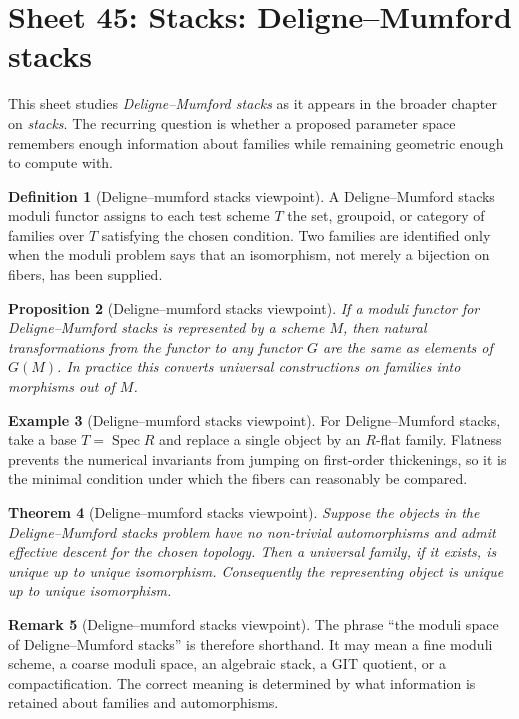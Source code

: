 \documentclass[11pt]{amsart}
\newtheorem{theorem}{Theorem}[section]
\newtheorem{proposition}[theorem]{Proposition}
\theoremstyle{definition}
\newtheorem{definition}[theorem]{Definition}
\newtheorem{example}[theorem]{Example}
\newtheorem{remark}[theorem]{Remark}
\newcommand{\Spec}{\operatorname{Spec}}
\begin{document}
\section{Sheet 45: Stacks: Deligne--Mumford stacks}
This sheet studies \emph{Deligne--Mumford stacks} as it appears in the broader chapter on \emph{stacks}.  The recurring question is whether a proposed parameter space remembers enough information about families while remaining geometric enough to compute with.
\begin{definition}[Deligne--mumford stacks viewpoint]
A Deligne--Mumford stacks moduli functor assigns to each test scheme $T$ the set, groupoid, or category of families over $T$ satisfying the chosen condition.  Two families are identified only when the moduli problem says that an isomorphism, not merely a bijection on fibers, has been supplied.
\end{definition}
\begin{proposition}[Deligne--mumford stacks viewpoint]
If a moduli functor for Deligne--Mumford stacks is represented by a scheme $M$, then natural transformations from the functor to any functor $G$ are the same as elements of $G(M)$.  In practice this converts universal constructions on families into morphisms out of $M$.
\end{proposition}
\begin{example}[Deligne--mumford stacks viewpoint]
For Deligne--Mumford stacks, take a base $T=\Spec R$ and replace a single object by an $R$-flat family.  Flatness prevents the numerical invariants from jumping on first-order thickenings, so it is the minimal condition under which the fibers can reasonably be compared.
\end{example}
\begin{theorem}[Deligne--mumford stacks viewpoint]
Suppose the objects in the Deligne--Mumford stacks problem have no non-trivial automorphisms and admit effective descent for the chosen topology.  Then a universal family, if it exists, is unique up to unique isomorphism.  Consequently the representing object is unique up to unique isomorphism.
\end{theorem}
\begin{remark}[Deligne--mumford stacks viewpoint]
The phrase ``the moduli space of Deligne--Mumford stacks'' is therefore shorthand.  It may mean a fine moduli scheme, a coarse moduli space, an algebraic stack, a GIT quotient, or a compactification.  The correct meaning is determined by what information is retained about families and automorphisms.
\end{remark}
\end{document}
